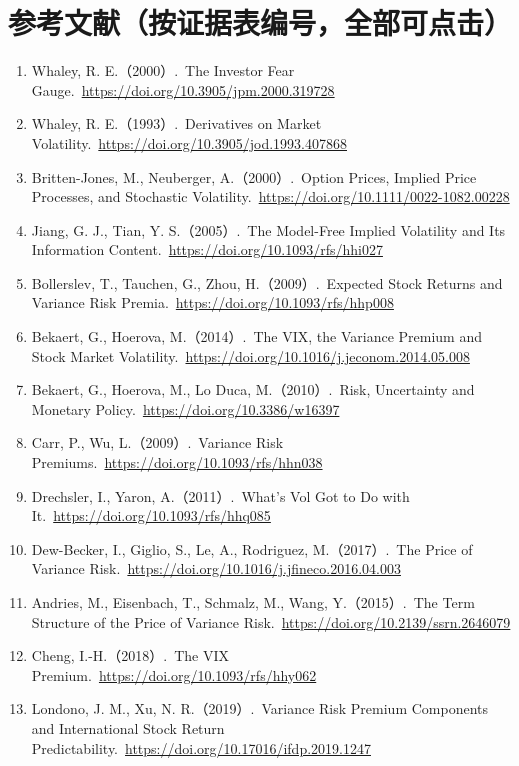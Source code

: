 \documentclass[11pt,a4paper]{article}
\begin{document}
\newpage
\section{参考文献（按证据表编号，全部可点击）}

\begin{enumerate}[leftmargin=2.2em]
  \item Whaley, R. E.（2000）.\ The Investor Fear Gauge.\ \url{https://doi.org/10.3905/jpm.2000.319728}
  \item Whaley, R. E.（1993）.\ Derivatives on Market Volatility.\ \url{https://doi.org/10.3905/jod.1993.407868}
  \item Britten-Jones, M., Neuberger, A.（2000）.\ Option Prices, Implied Price Processes, and Stochastic Volatility.\ \url{https://doi.org/10.1111/0022-1082.00228}
  \item Jiang, G. J., Tian, Y. S.（2005）.\ The Model-Free Implied Volatility and Its Information Content.\ \url{https://doi.org/10.1093/rfs/hhi027}
  \item Bollerslev, T., Tauchen, G., Zhou, H.（2009）.\ Expected Stock Returns and Variance Risk Premia.\ \url{https://doi.org/10.1093/rfs/hhp008}
  \item Bekaert, G., Hoerova, M.（2014）.\ The VIX, the Variance Premium and Stock Market Volatility.\ \url{https://doi.org/10.1016/j.jeconom.2014.05.008}
  \item Bekaert, G., Hoerova, M., Lo Duca, M.（2010）.\ Risk, Uncertainty and Monetary Policy.\ \url{https://doi.org/10.3386/w16397}
  \item Carr, P., Wu, L.（2009）.\ Variance Risk Premiums.\ \url{https://doi.org/10.1093/rfs/hhn038}
  \item Drechsler, I., Yaron, A.（2011）.\ What's Vol Got to Do with It.\ \url{https://doi.org/10.1093/rfs/hhq085}
  \item Dew-Becker, I., Giglio, S., Le, A., Rodriguez, M.（2017）.\ The Price of Variance Risk.\ \url{https://doi.org/10.1016/j.jfineco.2016.04.003}
  \item Andries, M., Eisenbach, T., Schmalz, M., Wang, Y.（2015）.\ The Term Structure of the Price of Variance Risk.\ \url{https://doi.org/10.2139/ssrn.2646079}
  \item Cheng, I.-H.（2018）.\ The VIX Premium.\ \url{https://doi.org/10.1093/rfs/hhy062}
  \item Londono, J. M., Xu, N. R.（2019）.\ Variance Risk Premium Components and International Stock Return Predictability.\ \url{https://doi.org/10.17016/ifdp.2019.1247}

\end{enumerate}
\end{document}
